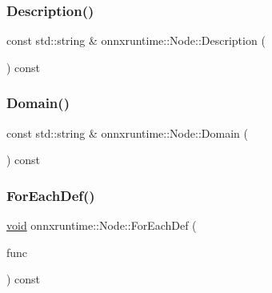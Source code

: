 \subsubsection{\texorpdfstring{Description()}{Description()}}
{\footnotesize\ttfamily const std\+::string \& onnxruntime\+::\+Node\+::\+Description (\begin{DoxyParamCaption}{ }\end{DoxyParamCaption}) const\hspace{0.3cm}{\ttfamily [noexcept]}}

\mbox{\label{classonnxruntime_1_1Node_a69a06f1a30552a32d6519f056ab02d71}} 
\subsubsection{\texorpdfstring{Domain()}{Domain()}}
{\footnotesize\ttfamily const std\+::string \& onnxruntime\+::\+Node\+::\+Domain (\begin{DoxyParamCaption}{ }\end{DoxyParamCaption}) const\hspace{0.3cm}{\ttfamily [noexcept]}}

\mbox{\label{classonnxruntime_1_1Node_aa5b858528fbdf2d3e4f3d4bda024c820}} 
\subsubsection{\texorpdfstring{For\+Each\+Def()}{ForEachDef()}}
{\footnotesize\ttfamily \mbox{\hyperlink{mlasi_8h_a88f941d423cb2a819b70a1358982b1a6}{void}} onnxruntime\+::\+Node\+::\+For\+Each\+Def (\begin{DoxyParamCaption}\item[{std\+::function$<$ \mbox{\hyperlink{mlasi_8h_a88f941d423cb2a819b70a1358982b1a6}{void}}(const \mbox{\hyperlink{classonnxruntime_1_1NodeArg}{onnxruntime\+::\+Node\+Arg}} $\ast$, bool is\+\_\+input)$>$}]{func }\end{DoxyParamCaption}) const}

\mbox{\label{classonnxruntime_1_1Node_a18c5aa182e07cf09b8ab8d9deb014a8c}} 
